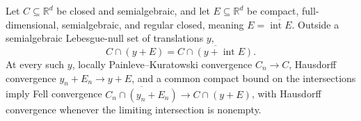 Let \(C\subseteq\mathbb R^d\) be closed and semialgebraic, and let \(E\subseteq\mathbb R^d\) be compact, full-dimensional, semialgebraic, and regular closed, meaning \(E=\overline{\operatorname{int}E}\).  Outside a semialgebraic Lebesgue-null set of translations \(y\),
\[
 C\cap(y+E)=\overline{C\cap(y+\operatorname{int}E)}.
\]
At every such \(y\), locally Painleve--Kuratowski convergence \(C_n\to C\), Hausdorff convergence \(y_n+E_n\to y+E\), and a common compact bound on the intersections imply Fell convergence \(\overline{C_n\cap(y_n+E_n)}\to C\cap(y+E)\), with Hausdorff convergence whenever the limiting intersection is nonempty.